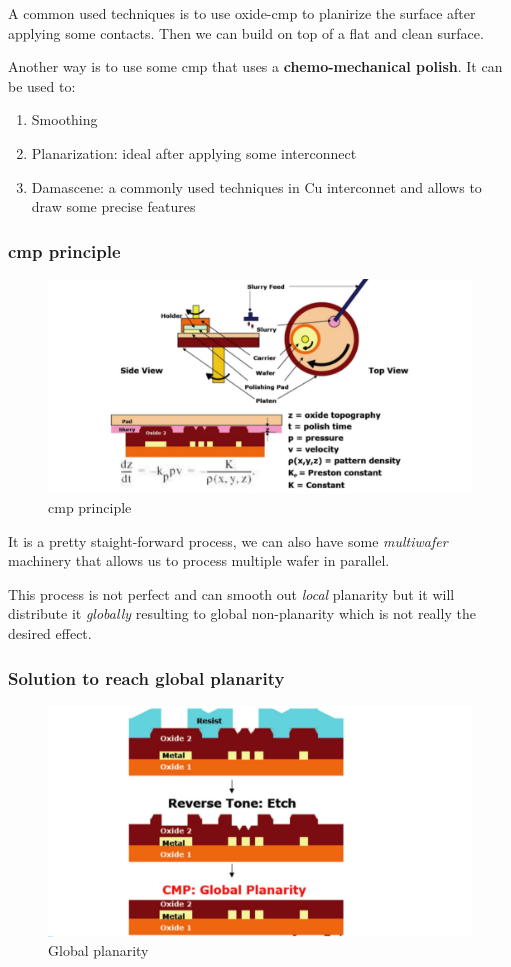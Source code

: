 \documentclass{report}
\begin{document}
A common used techniques is to use oxide-\gls{cmp} to planirize the surface after applying some contacts. Then we can build on top of a flat and clean surface.

Another way is to use some \gls{cmp} that uses a \textbf{chemo-mechanical polish}. It can be used to:

\begin{enumerate}
    \item Smoothing
    \item Planarization: ideal after applying some interconnect
    \item Damascene: a commonly used techniques in Cu interconnet and allows to draw some precise features
\end{enumerate}

\subsubsection{\gls{cmp} principle}

\begin{figure}[H]
    \centering
    \includegraphics[width=0.75\linewidth]{cmp_lucent.png}
    \caption{\gls{cmp} principle}
    \label{fig:enter-label}
\end{figure}

It is a pretty staight-forward process, we can also have some \textit{multiwafer} machinery that allows us to process multiple wafer in parallel.

This process is not perfect and can smooth out \textit{local} planarity but it will distribute it \textit{globally} resulting to global non-planarity which is not really the desired effect.

\subsubsection{Solution to reach global planarity}

\begin{figure}[H]
    \centering
    \includegraphics[width=0.65\linewidth]{global_planarity.png}
    \caption{Global planarity}
    \label{fig:enter-label}
\end{figure}
\end{document}
